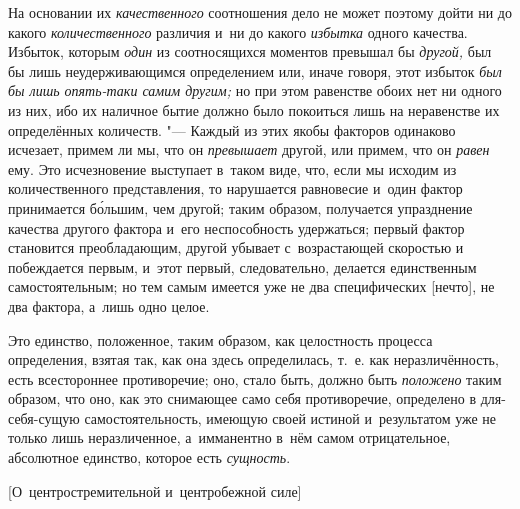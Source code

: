 На основании их {\em качественного} соотношения дело не может поэтому дойти ни
до какого {\em количественного} различия и~ни до какого {\em избытка} одного
качества. Избыток, которым {\em один} из соотносящихся моментов превышал бы
{\em другой,} был бы лишь неудерживающимся определением или, иначе говоря, этот
избыток {\em был бы лишь опять-таки самим другим;} но при этом равенстве обоих
нет ни одного из них, ибо их наличное бытие должно было покоиться лишь на
неравенстве их определённых количеств. "--- Каждый из этих якобы факторов
одинаково исчезает, примем ли мы, что он {\em превышает} другой, или примем,
что он {\em равен} ему. Это исчезновение выступает в~таком виде, что, если мы
исходим из количественного представления, то нарушается равновесие и~один
фактор принимается б\'{о}льшим, чем другой; таким образом, получается
упразднение качества другого фактора и~его неспособность удержаться; первый
фактор становится преобладающим, другой убывает с~возрастающей скоростью и
побеждается первым, и~этот первый, следовательно, делается единственным
самостоятельным; но тем самым имеется уже не два специфических [нечто], не два
фактора, а~лишь одно целое.

Это единство, положенное, таким образом, как целостность процесса определения,
взятая так, как она здесь определилась, т.~е. как неразличённость, есть
всестороннее противоречие; оно, стало быть, должно быть {\em положено} таким
образом, что оно, как это снимающее само себя противоречие, определено в
для-себя-сущую самостоятельность, имеющую своей истиной и~результатом уже не
только лишь неразличенное, а~имманентно в~нём самом отрицательное, абсолютное
единство, которое есть {\em сущность}.

%
{[О~центростремительной и~центробежной силе]}

